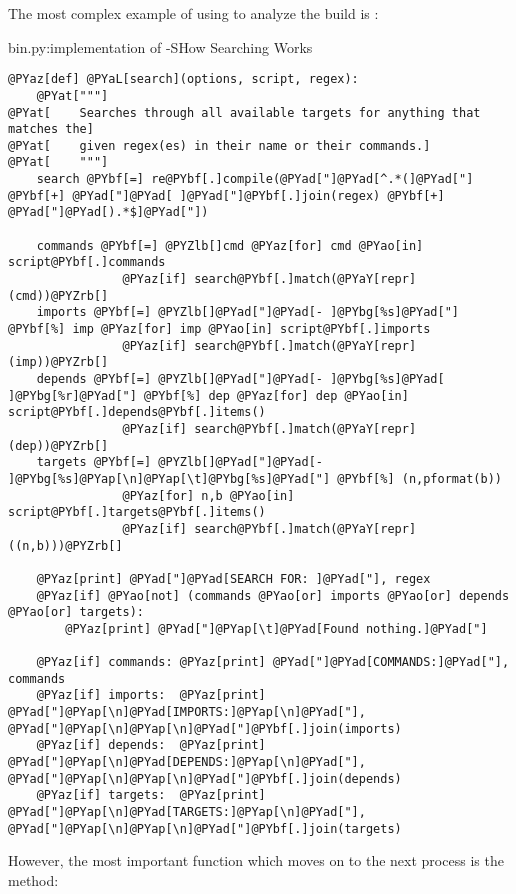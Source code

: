The most complex example of using  to analyze the build is
:

\begin{code}{bin.py:implementation of -S}{How Searching Works}
\begin{Verbatim}[commandchars=@\[\]]
@PYaz[def] @PYaL[search](options, script, regex):
    @PYat["""]
@PYat[    Searches through all available targets for anything that matches the]
@PYat[    given regex(es) in their name or their commands.]
@PYat[    """]
    search @PYbf[=] re@PYbf[.]compile(@PYad["]@PYad[^.*(]@PYad["] @PYbf[+] @PYad["]@PYad[ ]@PYad["]@PYbf[.]join(regex) @PYbf[+] @PYad["]@PYad[).*$]@PYad["])

    commands @PYbf[=] @PYZlb[]cmd @PYaz[for] cmd @PYao[in] script@PYbf[.]commands
                @PYaz[if] search@PYbf[.]match(@PYaY[repr](cmd))@PYZrb[]
    imports @PYbf[=] @PYZlb[]@PYad["]@PYad[- ]@PYbg[%s]@PYad["] @PYbf[%] imp @PYaz[for] imp @PYao[in] script@PYbf[.]imports
                @PYaz[if] search@PYbf[.]match(@PYaY[repr](imp))@PYZrb[]
    depends @PYbf[=] @PYZlb[]@PYad["]@PYad[- ]@PYbg[%s]@PYad[ ]@PYbg[%r]@PYad["] @PYbf[%] dep @PYaz[for] dep @PYao[in] script@PYbf[.]depends@PYbf[.]items()
                @PYaz[if] search@PYbf[.]match(@PYaY[repr](dep))@PYZrb[]
    targets @PYbf[=] @PYZlb[]@PYad["]@PYad[- ]@PYbg[%s]@PYap[\n]@PYap[\t]@PYbg[%s]@PYad["] @PYbf[%] (n,pformat(b))
                @PYaz[for] n,b @PYao[in] script@PYbf[.]targets@PYbf[.]items()
                @PYaz[if] search@PYbf[.]match(@PYaY[repr]((n,b)))@PYZrb[]

    @PYaz[print] @PYad["]@PYad[SEARCH FOR: ]@PYad["], regex
    @PYaz[if] @PYao[not] (commands @PYao[or] imports @PYao[or] depends @PYao[or] targets):
        @PYaz[print] @PYad["]@PYap[\t]@PYad[Found nothing.]@PYad["]

    @PYaz[if] commands: @PYaz[print] @PYad["]@PYad[COMMANDS:]@PYad["], commands
    @PYaz[if] imports:  @PYaz[print] @PYad["]@PYap[\n]@PYad[IMPORTS:]@PYap[\n]@PYad["], @PYad["]@PYap[\n]@PYap[\n]@PYad["]@PYbf[.]join(imports)
    @PYaz[if] depends:  @PYaz[print] @PYad["]@PYap[\n]@PYad[DEPENDS:]@PYap[\n]@PYad["], @PYad["]@PYap[\n]@PYap[\n]@PYad["]@PYbf[.]join(depends)
    @PYaz[if] targets:  @PYaz[print] @PYad["]@PYap[\n]@PYad[TARGETS:]@PYap[\n]@PYad["], @PYad["]@PYap[\n]@PYap[\n]@PYad["]@PYbf[.]join(targets)
\end{Verbatim}

\end{code}

However, the most important function which moves on to the next process is the
 method:

